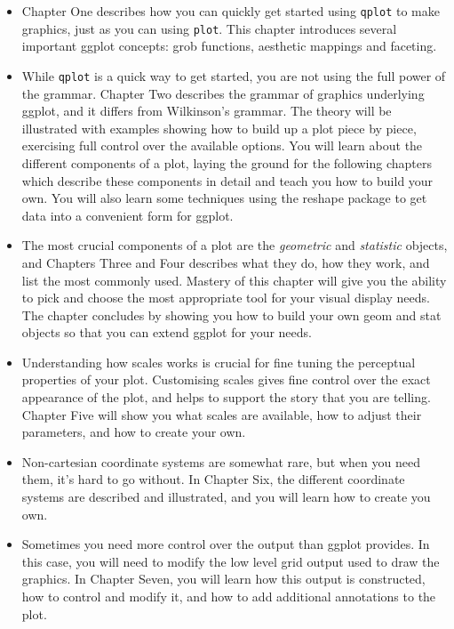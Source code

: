 \documentclass[oneside,letterpaper]{scrartcl}
\begin{document}
\begin{itemize}
  \item Chapter One describes how you can quickly get started using {\tt qplot} to make graphics, just as you can using {\tt plot}.  This chapter introduces several important ggplot concepts: grob functions, aesthetic mappings and faceting.
  
  \item While {\tt qplot} is a quick way to get started, you are not using the full power of the grammar.  Chapter Two describes the grammar of graphics underlying ggplot, and it differs from Wilkinson's grammar.  The theory will be illustrated with examples showing how to build up a plot piece by piece, exercising full control over the available options.  You will learn about the different components of a plot, laying the ground for the following chapters which describe these components in detail and teach you how to build your own.  You will also learn some techniques using the reshape package to get data into a convenient form for ggplot.

  \item The most crucial components of a plot are the {\em geometric} and {\em statistic} objects, and Chapters Three and Four describes what they do, how they work, and list the most commonly used.  Mastery of this chapter will give you the ability to pick and choose the most appropriate tool for your visual display needs.  The chapter concludes by showing you how to build your own geom and stat objects so that you can extend ggplot for your needs.

  \item Understanding how scales works is crucial for fine tuning the perceptual properties of your plot.  Customising scales gives fine control over the exact appearance of the plot, and helps to support the story that you are telling.  Chapter Five will show you what scales are available, how to adjust their parameters, and how to create your own.

  \item Non-cartesian coordinate systems are somewhat rare, but when you need them, it's hard to go without.  In Chapter Six, the different coordinate systems are described and illustrated, and you will learn how to create you own.
  
  \item Sometimes you need more control over the output than ggplot provides.  In this case, you will need to modify the low level grid output used to draw the graphics.  In Chapter Seven, you will learn how this output is constructed, how to control and modify it, and how to add additional annotations to the plot.

\end{itemize}
\end{document}
